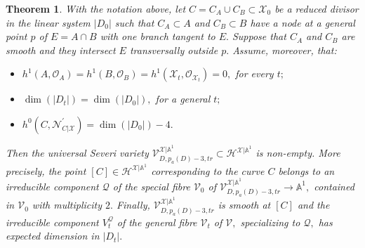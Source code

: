 \documentclass[plain]{amsart}
\newtheorem{theorem}{\textbf{Theorem}}[section]
\begin{document}
\begin{theorem}\label{th: triple-point}
With the notation above, let $C=C_A\cup C_B\subset \mathcal X_0$ be a reduced divisor 
in the linear system $|D_0|$ such that $C_A\subset A$ and $C_B\subset B$ have a node at a general point $p$ of
$E=A\cap B$ with one branch tangent to $E.$ Suppose that $C_A$ and $C_B$ are smooth 
 and they intersect $E$ transversally outside $p.$
Assume, moreover, that:
\begin{itemize}
\item[1)] $h^1(A,\mathcal O_A)=h^1(B,\mathcal O_B)=h^1(\mathcal X_t, \mathcal O_{\mathcal X_t})=0,$ for every $t;$
\item[2)] $\dim(|D_t|)=\dim(|D_0|),$ for a general $t;$\label{liscezza_schema_hilbert} 
\item[3)] $h^0(C,\mathcal N^\prime_{C|\mathcal X})=\dim(|D_0|)-4.$\label{expected_dimension}
\end{itemize}
Then the universal Severi variety $\mathcal V^{\mathcal X|\mathbb A^1}_{D,p_a(D)-3,tr}
\subset\mathcal H^{\mathcal X|\mathbb A^1}$ is non-empty. More precisely, the point $[C]\in\mathcal H^{\mathcal X|\mathbb A^1}$
corresponding to the curve $C$ belongs to an irreducible component $\mathcal Q$
of the special fibre $\mathcal V_0$ of $\mathcal V^{\mathcal X|\mathbb A^1}_{D,p_a(D)-3,tr}\to\mathbb A^1,$ contained in $\mathcal V_0$
with multiplicity $2.$ Finally, $\mathcal V^{\mathcal X|\mathbb A^1}_{D,p_a(D)-3,tr}$ is smooth at $[C]$
and the irreducible component $V_t^{\mathcal Q}$ of the general fibre $\mathcal V_t$ of $\mathcal V,$
specializing to $\mathcal Q,$ has expected dimension in $|D_t|.$
\end{theorem}
\end{document}
